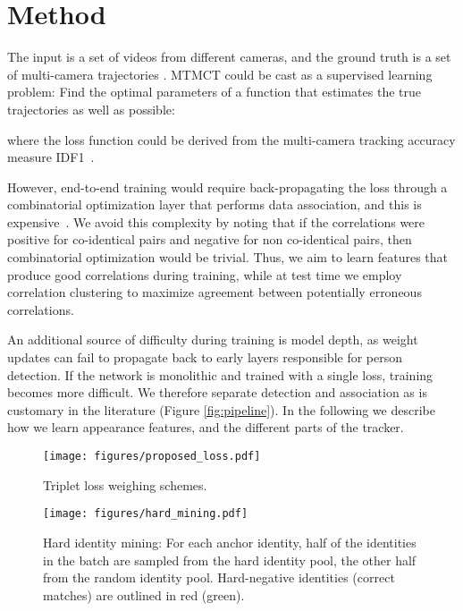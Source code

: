 \documentclass[10pt,twocolumn,letterpaper]{article}
\begin{document}
\section{Method}


The input is a set of videos  from  different cameras, and the ground truth is a set of multi-camera trajectories . MTMCT could be cast as a supervised learning problem: Find the optimal parameters  of a function  that estimates the true trajectories as well as possible:
  
where the loss function  could be derived from the multi-camera tracking accuracy measure IDF1~\cite{ristani2016performance}. 

However, end-to-end training would require back-propagating the loss through a combinatorial optimization layer that performs data association, and this is expensive~\cite{DeepFlow}. We avoid this complexity by noting that if the correlations were positive for co-identical pairs and negative for non co-identical pairs, then combinatorial optimization would be trivial. Thus, we aim to learn features that produce good correlations during training, while at test time we employ correlation clustering to maximize agreement between potentially erroneous correlations.

An additional source of difficulty during training is model depth, as weight updates can fail to propagate back to early layers responsible for person detection. If the network is monolithic and trained with a single loss, training becomes more difficult. We therefore separate detection and association as is customary in the literature (Figure \ref{fig:pipeline}). In the following we describe how we learn appearance features, and the different parts of the tracker.



\begin{figure*}[ht]
    \centering
    \begin{minipage}{.4\textwidth}
        \centering
        \texttt{[image: figures/proposed\_loss.pdf]}
        \caption{Triplet loss weighing schemes.}
        \label{fig:weighted_loss}
    \end{minipage}\begin{minipage}{0.6\textwidth}
        \centering
    	\texttt{[image: figures/hard\_mining.pdf]}
    	\caption{Hard identity mining: For each anchor identity, half of the  identities in the batch are sampled from the hard identity pool, the other half from the random identity pool. Hard-negative identities (correct matches) are outlined in red (green).}
        \label{fig:hard_mining}
    \end{minipage}
\end{figure*}
\end{document}
